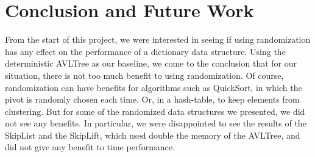 \documentclass[oribibl]{llncs}
\begin{document}
\section{Conclusion and Future Work}
\label{sctn:Conclusion}

From the start of this project, we were interested in seeing if using randomization has any effect on the performance of a dictionary data structure. Using the deterministic AVLTree as our baseline, we come to the conclusion that for our situation, there is not too much benefit to using randomization. Of course, randomization can have benefits for algorithms such as QuickSort, in which the pivot is randomly chosen each time. Or, in a hash-table, to keep elements from clustering. But for some of the randomized data structures we presented, we did not see any benefits. In particular, we were disappointed to see the results of the SkipList and the SkipLift, which used double the memory of the AVLTree, and did not give any benefit to time performance.





\end{document}
